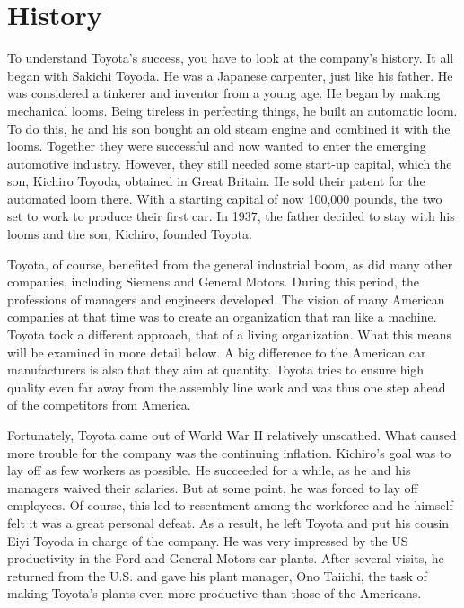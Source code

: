 \documentclass[a4paper,12pt]{scrartcl}
\begin{document}
\clearpage
\section{History}

    To understand Toyota's success, you have to look at the company's history. It all began with Sakichi Toyoda. He was a Japanese carpenter, just like his father. He was considered a tinkerer and inventor from a young age. He began by making mechanical looms. Being tireless in perfecting things, he built an automatic loom. To do this, he and his son bought an old steam engine and combined it with the looms. Together they were successful and now wanted to enter the emerging automotive industry. However, they still needed some start-up capital, which the son, Kichiro Toyoda, obtained in Great Britain. He sold their patent for the automated loom there. With a starting capital of now 100,000 pounds, the two set to work to produce their first car. In 1937, the father decided to stay with his looms and the son, Kichiro, founded Toyota. 
    
    Toyota, of course, benefited from the general industrial boom, as did many other companies, including Siemens and General Motors. During this period, the professions of managers and engineers developed. The vision of many American companies at that time was to create an organization that ran like a machine. Toyota took a different approach, that of a living organization. What this means will be examined in more detail below. A big difference to the American car manufacturers is also that they aim at quantity. Toyota tries to ensure high quality even far away from the assembly line work and was thus one step ahead of the competitors from America.
    
    Fortunately, Toyota came out of World War II relatively unscathed. What caused more trouble for the company was the continuing inflation. Kichiro's goal was to lay off as few workers as possible. He succeeded for a while, as he and his managers waived their salaries. But at some point, he was forced to lay off employees. Of course, this led to resentment among the workforce and he himself felt it was a great personal defeat. As a result, he left Toyota and put his cousin Eiyi Toyoda in charge of the company. He was very impressed by the US productivity in the Ford and General Motors car plants. After several visits, he returned from the U.S. and gave his plant manager, Ono Taiichi, the task of making Toyota's plants even more productive than those of the Americans.
    
\end{document}
